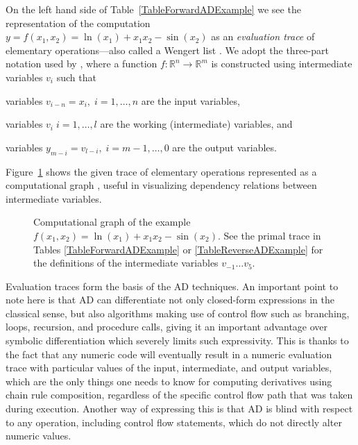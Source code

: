 \documentclass[twoside,11pt]{article}
\begin{document}
On the left hand side of Table~\ref{TableForwardADExample} we see the representation of the computation $y = f(x_1, x_2) = \ln(x_1) + x_1 x_2 - \sin(x_2)$ as an \emph{evaluation trace} of elementary operations---also called a Wengert list \citep{Wengert1964}. We adopt the three-part notation used by \citet{Griewank2008}, where a function $f: \mathbb{R}^n \to \mathbb{R}^m$ is constructed using intermediate variables $v_i$ such that
\begin{compactitem}
  \item variables $v_{i-n} = x_i,\;i = 1, \dotsc, n$ are the input variables,
  \item variables $v_i\;i = 1, \dotsc, l$ are the working (intermediate) variables, and
  \item variables $y_{m-i} = v_{l-i},\;i = m - 1, \dotsc, 0$ are the output variables.
\end{compactitem}
Figure~\ref{FigureComputationalGraph} shows the given trace of elementary operations represented as a computational graph \citep{Bauer1974}, useful in visualizing dependency relations between intermediate variables.

\begin{figure}
  \centering
  \trimbox{0cm -0.5cm}{\resizebox{0.8\textwidth}{!}{\normalsize}}
  \caption{Computational graph of the example $f(x_1, x_2) = \ln(x_1) + x_1 x_2 - \sin(x_2)$. See the primal trace in Tables \ref{TableForwardADExample} or \ref{TableReverseADExample} for the definitions of the intermediate variables $v_{-1} \dots v_5$\;.}
  \label{FigureComputationalGraph}
\end{figure}

Evaluation traces form the basis of the AD techniques. An important point to note here is that AD can differentiate not only closed-form expressions in the classical sense, but also algorithms making use of control flow such as branching, loops, recursion, and procedure calls, giving it an important advantage over symbolic differentiation which severely limits such expressivity. This is thanks to the fact that any numeric code will eventually result in a numeric evaluation trace with particular values of the input, intermediate, and output variables, which are the only things one needs to know for computing derivatives using chain rule composition, regardless of the specific control flow path that was taken during execution. Another way of expressing this is that AD is blind with respect to any operation, including control flow statements, which do not directly alter numeric values.
\end{document}
